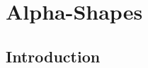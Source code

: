 %
%
%
%
%
%
%
%
%
%



\chapter{Alpha-Shapes} \label{I1_ChapterAlphashapes}


\section{Introduction}

